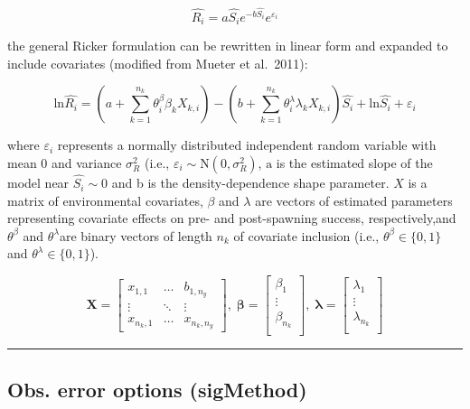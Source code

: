 \documentclass[
]{article}
\begin{document}
\[\hat{R_i}= a\hat{S_i}e^{-b\hat{S_i}} e^{\varepsilon_i} \]

the general Ricker formulation can be rewritten in linear form and
expanded to include covariates (modified from Mueter et al.~2011):

\[\mathrm{ln}\hat{R_i}= \left(a+ \sum_{k=1}^{n_k}{\theta_i^{\beta}\beta_k X_{k,i}} \right)-\left(b+ \sum_{k=1}^{n_k}{\theta_i^{\lambda}\lambda_k X_{k,i}}\right)\hat{S_i}+\mathrm{ln}\hat{S_i}+\varepsilon_i\]

where \(\varepsilon_i\) represents a normally distributed independent
random variable with mean 0 and variance \(\sigma^2_R\) (i.e.,
\(\varepsilon_i\sim \mathrm N(0,\sigma^2_R)\), \(\mathrm a\) is the
estimated slope of the model near \(\hat{S_i}\sim0\) and b is the
density-dependence shape parameter. \({X}\) is a matrix of environmental
covariates, \(\beta\) and \(\lambda\) are vectors of estimated
parameters representing covariate effects on pre- and post-spawning
success, respectively,and \(\theta^{\beta}\) and \(\theta^{\lambda}\)are
binary vectors of length \(n_k\) of covariate inclusion (i.e.,
\({\theta^{\beta}} \in \{0,1 \}\) and
\({\theta^{\lambda}} \in \{0,1 \}\)).

\[\mathbf{X} = \left[\begin{array}
{rrr}
x_{1,1} & \dots  & b_{1,n_y} \\
\vdots & \ddots & \vdots \\
x_{n_k,1} & \dots  & x_{n_k,n_y}
\end{array}\right],\;
\mathbf{\beta} = \left[\begin{array}
{rrr}
\beta_1 \\
\vdots  \\
\beta_{n_k} \\
\end{array}\right],\;
\mathbf{\lambda} = \left[\begin{array}
{rrr}
\lambda_1 \\
\vdots  \\
\lambda_{n_k}\\
\end{array}\right]
\]

\begin{center}\rule{0.5\linewidth}{0.5pt}\end{center}

\hypertarget{obs.-error-options-sigmethod}{%
\subsection{Obs. error options
(sigMethod)}\label{obs.-error-options-sigmethod}}
\end{document}
